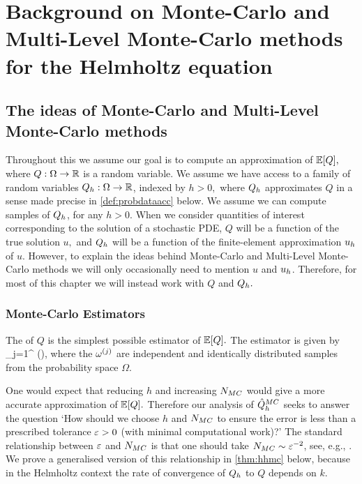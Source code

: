 \section{Background on Monte-Carlo and Multi-Level Monte-Carlo methods for the Helmholtz equation}\label{sec:overview}
\subsection{The ideas of Monte-Carlo and Multi-Level Monte-Carlo methods}\label{sec:mlmcideasoverview}
Throughout this  we assume our goal is to compute an approximation of $\EXP{Q},$ where $Q:\Omega\rightarrow\mathbb R$ is a random variable. We assume we have access to a family of random variables $Q_{h}:\Omega\rightarrow\mathbb R$, indexed by $h>0,$ where $Q_{h}$ approximates $Q$ in a sense made precise in \cref{def:probdataacc} below. We assume we can compute samples of $Q_{h}$, for any $h>0$. When we consider quantities of interest corresponding to the solution of a stochastic PDE, $Q$ will be a function of the true solution $u,$ and $Q_{h}$ will be a function of the finite-element approximation $u_{h}$ of $u.$ However, to explain the ideas behind Monte-Carlo and Multi-Level Monte-Carlo methods we will only occasionally need to mention $u$ and $u_{h}$. Therefore, for most of this chapter we will instead work with $Q$ and $Q_{h}.$

\subsubsection{Monte-Carlo Estimators}

The  of $Q$ is the simplest possible estimator of $\EXP{Q}.$ The estimator is given by
\beqs
\QhatMC \de {} \sum_{j=1}^{\NMC} \Qh\mleft(\omegasj\mright),
\eeqs
where the $\omega^{(j)}$ are independent and identically distributed samples from the probability space $\Omega$.

One would expect that reducing $h$ and increasing $N_{MC}$ would give a more accurate approximation of $\EXP{Q}.$ Therefore our analysis of $\hat{Q}^{MC}_{h}$ seeks to answer the question `How should we choose $h$ and $N_{MC}$ to ensure the error is less than a prescribed tolerance $\varepsilon>0$ (with minimal computational work)?' The standard relationship between $\varepsilon$ and $N_{MC}$ is that one should take $N_{MC} \sim \varepsilon^{-2}$, see, e.g., \cite[Text after equation (3)]{ClGiScTe:11}. We prove a generalised version of this relationship in \cref{thm:hhmc} below, because in the Helmholtz context the rate of convergence of $Q_{h}$ to $Q$ depends on $k.$

